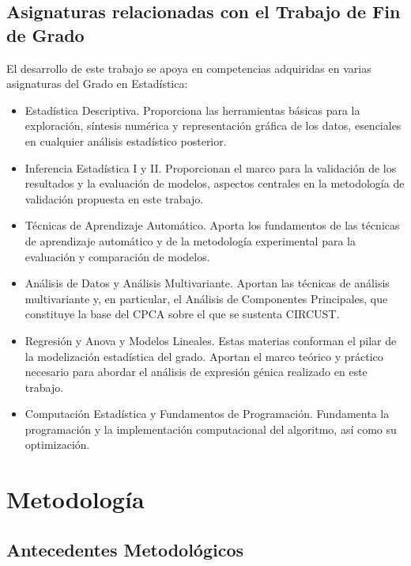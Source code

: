 \documentclass[12pt, a4paper]{report}
\begin{document}
\section{Asignaturas relacionadas con el Trabajo de Fin de Grado}

El desarrollo de este trabajo se apoya en competencias adquiridas en varias asignaturas del Grado en Estadística:

\begin{itemize}
    \item Estadística Descriptiva. Proporciona las herramientas básicas para la exploración, síntesis numérica y representación gráfica de los datos, esenciales en cualquier análisis estadístico posterior.
    \item Inferencia Estadística I y II. Proporcionan el marco para la validación de los resultados y la evaluación de modelos, aspectos centrales en la metodología de validación propuesta en este trabajo.
    \item Técnicas de Aprendizaje Automático. Aporta los fundamentos de las técnicas de aprendizaje automático y de la metodología experimental para la evaluación y comparación de modelos.
    \item Análisis de Datos y Análisis Multivariante. Aportan las técnicas de análisis multivariante y, en particular, el Análisis de Componentes Principales, que constituye la base del CPCA sobre el que se sustenta CIRCUST.

    \item Regresión y Anova y Modelos Lineales. Estas materias conforman el pilar de la modelización estadística del grado. Aportan el marco teórico y práctico necesario para abordar el análisis de expresión génica realizado en este trabajo.

    \item Computación Estadística y Fundamentos de Programación. Fundamenta la programación y la implementación computacional del algoritmo, así como su optimización.
\end{itemize}

\chapter{Metodología}
\label{cap:metodologia}

\section{Antecedentes Metodológicos}
\end{document}
